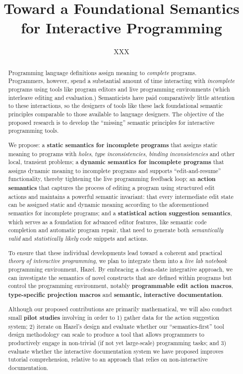\documentclass{purple}
\title{Toward a Foundational Semantics 
  \\ 
  for Interactive Programming}
\author{
XXX
}
\newcommand{\Hazel}[0]{\textsf{Hazel}\xspace}
\newcommand{\HazelEnv}[0]{\Hazel\xspace}
\begin{document}
\maketitle

\begin{abstract}
%
Programming language definitions assign meaning to \emph{complete}
programs.
%
Programmers, however, spend a substantial amount of time interacting
with \emph{incomplete} programs using tools like program editors and
live programming environments (which interleave editing and
evaluation.)
%
Semanticists have paid comparatively little attention to these
interactions, so the designers of tools like these lack foundational
semantic principles comparable to those available to language
designers.
%
The objective of the proposed research is to develop the ``missing''
semantic principles for interactive programming tools. 

We propose:
%
a \textbf{static semantics for incomplete programs} that assigns static meaning to programs with \emph{holes}, \emph{type inconsistencies}, \emph{binding inconsistencies} and other local, transient problems; 
%
a \textbf{dynamic semantics for incomplete programs} that assigns dynamic meaning to incomplete programs and supports ``edit-and-resume'' functionality, thereby tightening the live programming feedback loop;  
%
an \textbf{action semantics} that captures the process of editing a program using structured edit actions and maintains a powerful semantic invariant: that every intermediate edit state can be assigned static and dynamic meaning according to the aforementioned semantics for incomplete programs; and 
%
a \textbf{statistical action suggestion semantics}, which serves as a foundation for advanced editor features, like semantic code completion and automatic program repair, that need to generate both \emph{semantically valid} and \emph{statistically likely} code snippets and actions.

To ensure that these individual developments lead toward a coherent
and practical \emph{theory of interactive programming}, we plan to
integrate them into a \emph{live lab notebook} programming
environment, \HazelEnv. By embracing a clean-slate integrative
approach, we can investigate the semantics of novel constructs that
are defined within programs but control the programming environment,
notably \textbf{programmable edit action macros},
\textbf{type-specific projection macros} and \textbf{semantic,
  interactive documentation}.

Although our proposed contributions are primarily {mathematical}, we
will also conduct small \textbf{pilot studies} involving in order to
1) gather data for the action suggestion system; 2) iterate on
\HazelEnv's design and evaluate whether our ``semantics-first'' tool
design methodology can scale to produce a tool that allows programmers
to productively engage in non-trivial (if not yet large-scale)
programming tasks; and 3) evaluate whether the interactive
documentation system we have proposed improves tutorial comprehension,
relative to an approach that relies on non-interactive documentation.

\end{abstract}
\end{document}
